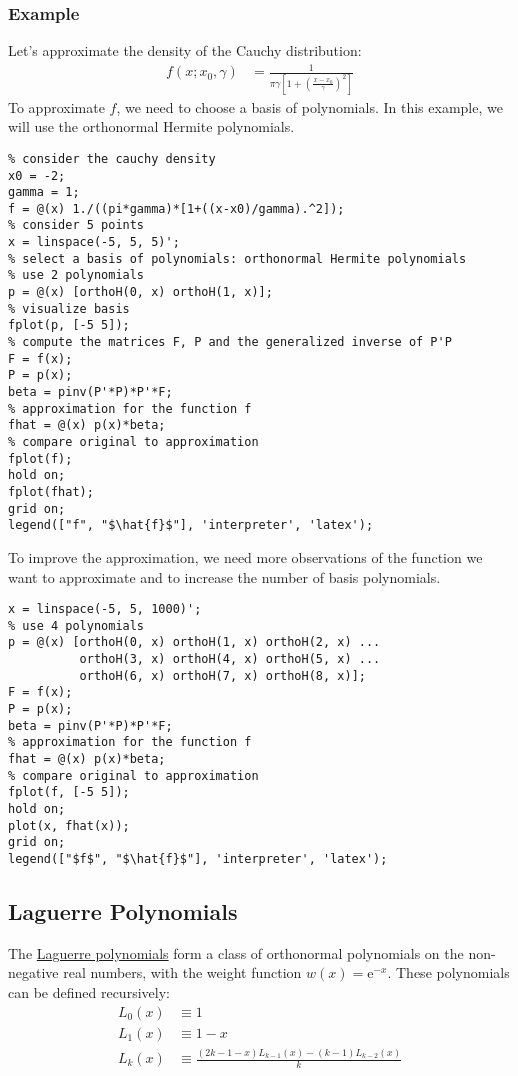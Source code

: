 \documentclass[12pt, a4paper]{article}
\newcommand{\e}[1]{\text{e}^{#1}}
\begin{document}
\subsubsection{Example}
\label{sec:org4110795}
Let's approximate the density of the Cauchy distribution:
\begin{align*}
f(x; x_0, \gamma)&=\frac{1}{\pi\gamma\left[1+\left(\frac{x-x_0}{\gamma}\right)^2\right]}
\end{align*}
To approximate \(f\), we need to choose a basis of polynomials.
In this example, we will use the orthonormal Hermite polynomials.
\lstset{language=matlab,label= ,caption= ,captionpos=b,firstnumber=1,numbers=left,style=Matlab-editor}
\begin{lstlisting}
% consider the cauchy density
x0 = -2;
gamma = 1;
f = @(x) 1./((pi*gamma)*[1+((x-x0)/gamma).^2]);
% consider 5 points
x = linspace(-5, 5, 5)';
% select a basis of polynomials: orthonormal Hermite polynomials
% use 2 polynomials
p = @(x) [orthoH(0, x) orthoH(1, x)];
% visualize basis
fplot(p, [-5 5]);
% compute the matrices F, P and the generalized inverse of P'P
F = f(x);
P = p(x);
beta = pinv(P'*P)*P'*F;
% approximation for the function f
fhat = @(x) p(x)*beta;
% compare original to approximation
fplot(f);
hold on;
fplot(fhat);
grid on;
legend(["f", "$\hat{f}$"], 'interpreter', 'latex');
\end{lstlisting}

To improve the approximation, we need more observations of the function we want to approximate and to increase the number of basis polynomials.
\lstset{language=matlab,label= ,caption= ,captionpos=b,firstnumber=1,numbers=left,style=Matlab-editor}
\begin{lstlisting}
x = linspace(-5, 5, 1000)';
% use 4 polynomials
p = @(x) [orthoH(0, x) orthoH(1, x) orthoH(2, x) ...
          orthoH(3, x) orthoH(4, x) orthoH(5, x) ...
          orthoH(6, x) orthoH(7, x) orthoH(8, x)];
F = f(x);
P = p(x);
beta = pinv(P'*P)*P'*F;
% approximation for the function f
fhat = @(x) p(x)*beta;
% compare original to approximation
fplot(f, [-5 5]);
hold on;
plot(x, fhat(x));
grid on;
legend(["$f$", "$\hat{f}$"], 'interpreter', 'latex');
\end{lstlisting}
\subsection{Laguerre Polynomials}
\label{sec:org4a37d52}
The \href{https://en.wikipedia.org/wiki/Laguerre\_polynomials}{Laguerre polynomials} form a class of orthonormal polynomials on the non-negative real numbers, with the weight function \(w(x)=\e{-x}\).
These polynomials can be defined recursively:
\begin{align*}
L_0(x) &\equiv 1\\
L_1(x) &\equiv 1-x\\
L_k(x) &\equiv \frac{(2k-1-x)L_{k-1}(x)-(k-1)L_{k-2}(x)}{k}
\end{align*}
\end{document}
